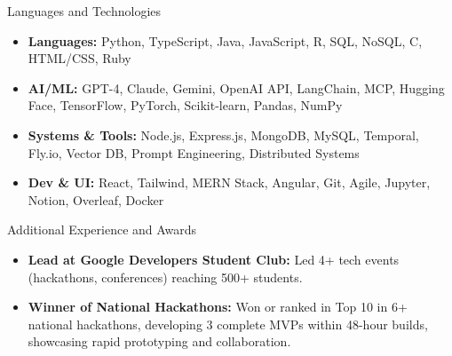 \documentclass[]{mcdowellcv}
\begin{document}
\begin{cvsection}{Languages and Technologies}
  \begin{cvsubsection}{}{}{}
    \begin{itemize}
      \item \textbf{Languages:} Python, TypeScript, Java, JavaScript, R, SQL, NoSQL, C, HTML/CSS, Ruby
      \item \textbf{AI/ML:} GPT-4, Claude, Gemini, OpenAI API, LangChain, MCP, Hugging Face, TensorFlow, PyTorch, Scikit-learn, Pandas, NumPy
      \item \textbf{Systems \& Tools:} Node.js, Express.js, MongoDB, MySQL, Temporal, Fly.io, Vector DB, Prompt Engineering, Distributed Systems
      \item \textbf{Dev \& UI:} React, Tailwind, MERN Stack, Angular, Git, Agile, Jupyter, Notion, Overleaf, Docker
    \end{itemize}
  \end{cvsubsection}
\end{cvsection}

\begin{cvsection}{Additional Experience and Awards}
  \begin{cvsubsection}{}{}{}
    \begin{itemize}
      \item \textbf{Lead at Google Developers Student Club:} Led 4+ tech events (hackathons, conferences) reaching 500+ students.
      \item \textbf{Winner of National Hackathons:} Won or ranked in Top 10 in 6+ national hackathons, developing 3 complete MVPs within 48-hour builds, showcasing rapid prototyping and collaboration.
    \end{itemize}
  \end{cvsubsection}
\end{cvsection}
\end{document}

